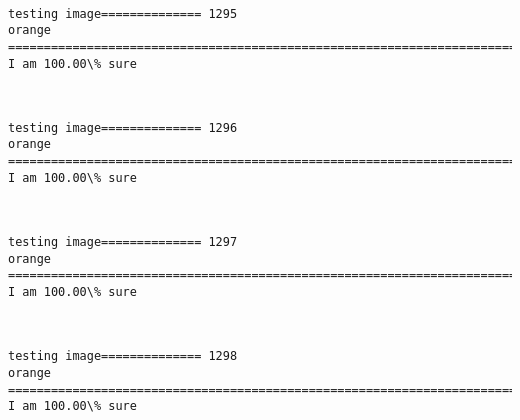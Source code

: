 \documentclass[11pt]{article}
\begin{document}
    \begin{center}
    \end{center}
    { \hspace*{\fill} \\}
    
    \begin{Verbatim}[commandchars=\\\{\}]
testing image============== 1295
orange
============================================================================
I am 100.00\% sure

    \end{Verbatim}

    \begin{center}
    \end{center}
    { \hspace*{\fill} \\}
    
    \begin{Verbatim}[commandchars=\\\{\}]
testing image============== 1296
orange
============================================================================
I am 100.00\% sure

    \end{Verbatim}

    \begin{center}
    \end{center}
    { \hspace*{\fill} \\}
    
    \begin{Verbatim}[commandchars=\\\{\}]
testing image============== 1297
orange
============================================================================
I am 100.00\% sure

    \end{Verbatim}

    \begin{center}
    \end{center}
    { \hspace*{\fill} \\}
    
    \begin{Verbatim}[commandchars=\\\{\}]
testing image============== 1298
orange
============================================================================
I am 100.00\% sure

    \end{Verbatim}
\end{document}
